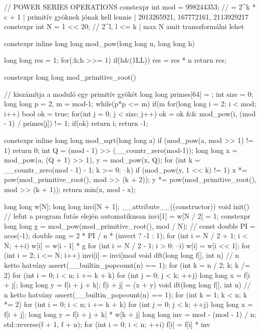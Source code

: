 // POWER SERIES OPERATIONS
constexpr int mod = 998244353; // = 2^k * c + 1 | primitív gyöknek jónak kell lennie | 2013265921, 167772161, 2113929217
constexpr int N = 1 << 20; // 2^l, l <= k | max N amit transzformálni lehet

constexpr inline long long mod_pow(long long n, long long h) {
    long long res = 1;
    for(;h;h >>= 1) { if(h&(1LL)) res = res * n %
    return res;
}

constexpr long long mod_primitive_root(){ // kiszámítja a moduló egy primitív gyökét
    long long primes[64] = {}; int size = 0; long long p = 2, m = mod-1;
    while(p*p <= m) { if(m %
    for(long long i = 2; i < mod; i++) { bool ok = true; for(int j = 0; j < size; j++) ok = ok && mod_pow(i, (mod - 1) / primes[j]) != 1; if(ok) return i; }
    return -1;
}

constexpr inline long long mod_sqrt(long long a) {
    if (mod_pow(a, mod >> 1) != 1) return 0;
    int Q = (mod - 1) >> (__countr_zero(mod-1));
    long long x = mod_pow(a, (Q + 1) >> 1), y = mod_pow(x, Q);
    for (int k = __countr_zero(mod - 1) - 1; k >= 0; --k)
        if (mod_pow(y, 1 << k) != 1) {
            x *= pow(mod_primitive_root(), mod >> (k + 2));
            y *= pow(mod_primitive_root(), mod >> (k + 1));
        }
    return min(x, mod - x);
}

long long w[N];
long long invi[N + 1];
__attribute__((constructor)) void init() { // lefut a program futás elején automatikusan
    invi[1] = w[N / 2] = 1;
    constexpr long long g = mod_pow(mod_primitive_root(), mod / N);
    // const double PI = acos(-1); double ang = 2 * PI / n * (invert ? -1 : 1);
    for (int i = N / 2 + 1; i < N; ++i) w[i] = w[i - 1] * g %
    for (int i = N / 2 - 1; i > 0; --i) w[i] = w[i << 1];
    for (int i = 2; i <= N; i++) invi[i] = invi[mod %
}
void dft(long long f[], int n) { // n ketto hatvány
    assert(__builtin_popcount(n) == 1);
    for (int k = n / 2; k; k /= 2)
        for (int i = 0; i < n; i += k + k)
            for (int j = 0; j < k; ++j) {
                long long x = f[i + j]; long long y = f[i + j + k]; f[i + j] = (x + y) %
            }
}
void ift(long long f[], int n) { // n ketto hatvány
    assert(__builtin_popcount(n) == 1);
    for (int k = 1; k < n; k *= 2)
        for (int i = 0; i < n; i += k + k)
            for (int j = 0; j < k; ++j) {
                long long x = f[i + j]; long long y = f[i + j + k] * w[k + j] %
            }
    long long inv = mod - (mod - 1) / n;
    std::reverse(f + 1, f + n);
    for (int i = 0; i < n; ++i) f[i] = f[i] * inv %
}

}}
